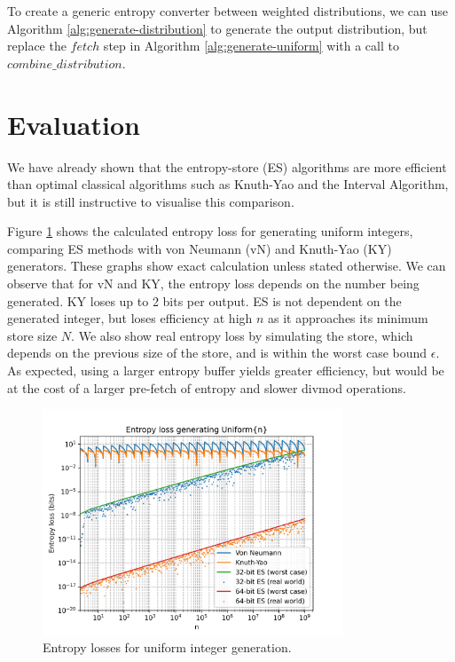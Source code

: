 \documentclass[12pt]{article}
\begin{document}
To create a generic entropy converter between weighted distributions, we can use Algorithm \ref{alg:generate-distribution} to generate the output distribution, but replace the $fetch$ step in Algorithm \ref{alg:generate-uniform} with a call to $combine\_distribution$.





\section {Evaluation}

We have already shown that the entropy-store (ES) algorithms are more efficient than optimal classical algorithms such as Knuth-Yao and the Interval Algorithm, but it is still instructive to visualise this comparison.

Figure \ref{fig:uniform-losses} shows the calculated entropy loss for generating uniform integers, comparing ES methods with von Neumann (vN) and Knuth-Yao (KY) generators. These graphs show exact calculation unless stated otherwise. We can observe that for vN and KY, the entropy loss depends on the number being generated. KY loses up to 2 bits per output. ES is not dependent on the generated integer, but loses efficiency at high $n$ as it approaches its minimum store size $N$. We also show real entropy loss by simulating the store, which depends on the previous size of the store, and is within the worst case bound $\epsilon$. As expected, using a larger entropy buffer yields greater efficiency, but would be at the cost of a larger pre-fetch of entropy and slower divmod operations. \cite{inteldivmodslowness}

\begin{figure}[ht]
\centering
\includegraphics[width=0.8\textwidth]{uniform_losses.png}
\caption{Entropy losses for uniform integer generation.}
\label{fig:uniform-losses}
\end{figure}
\end{document}
